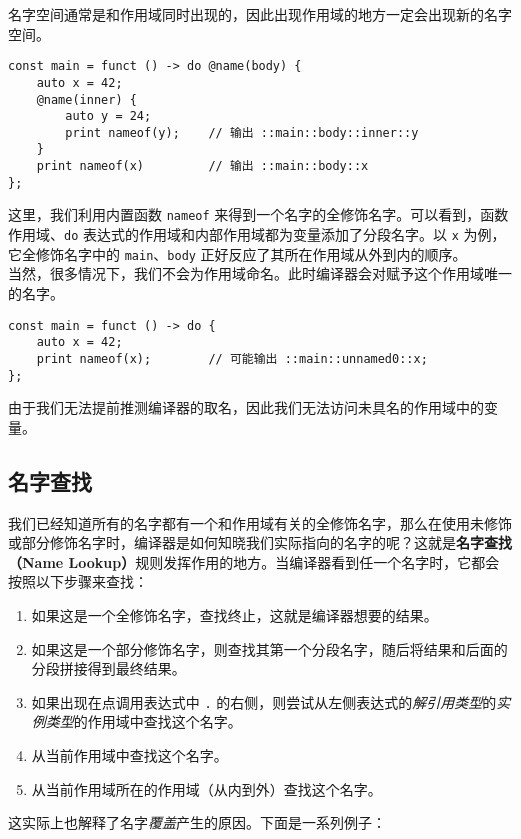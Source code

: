 名字空间通常是和作用域同时出现的，因此出现作用域的地方一定会出现新的名字空间。

\begin{lstlisting}
const main = funct () -> do @name(body) {
	auto x = 42;
	@name(inner) {
		auto y = 24;
		print nameof(y);	// 输出 ::main::body::inner::y
	}
	print nameof(x)			// 输出 ::main::body::x
};
\end{lstlisting}

这里，我们利用内置函数 \lstinline!nameof! 来得到一个名字的全修饰名字。可以看到，函数作用域、\lstinline!do! 表达式的作用域和内部作用域都为变量添加了分段名字。以 \lstinline!x! 为例，它全修饰名字中的 \lstinline!main!、\lstinline!body! 正好反应了其所在作用域从外到内的顺序。 \\

当然，很多情况下，我们不会为作用域命名。此时编译器会对赋予这个作用域唯一的名字。

\begin{lstlisting}
const main = funct () -> do {
	auto x = 42;
	print nameof(x);		// 可能输出 ::main::unnamed0::x;
};
\end{lstlisting}

由于我们无法提前推测编译器的取名，因此我们无法访问未具名的作用域中的变量。

\subsection{名字查找}

我们已经知道所有的名字都有一个和作用域有关的全修饰名字，那么在使用未修饰或部分修饰名字时，编译器是如何知晓我们实际指向的名字的呢？这就是\textbf{名字查找（Name Lookup）}规则发挥作用的地方。当编译器看到任一个名字时，它都会按照以下步骤来查找：

\begin{enumerate}
	\item 如果这是一个全修饰名字，查找终止，这就是编译器想要的结果。
	\item 如果这是一个部分修饰名字，则查找其第一个分段名字，随后将结果和后面的分段拼接得到最终结果。
	\item 如果出现在点调用表达式中 \lstinline!.! 的右侧，则尝试从左侧表达式的\emph{解引用类型}的\emph{实例类型}的作用域中查找这个名字。
	\item 从当前作用域中查找这个名字。
	\item 从当前作用域所在的作用域（从内到外）查找这个名字。
\end{enumerate}

这实际上也解释了名字\emph{覆盖}产生的原因。下面是一系列例子：

